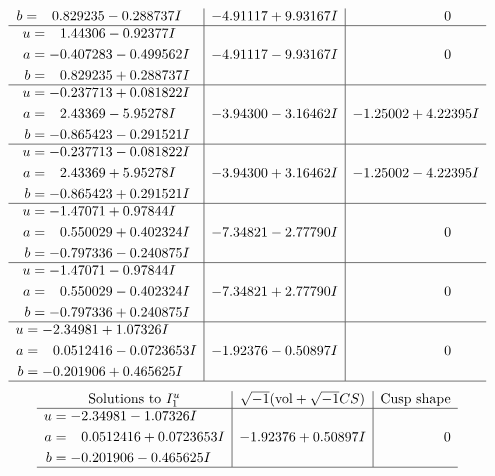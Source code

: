 \documentclass[1p]{elsarticle_modified}
\theoremstyle{definition}
\newcommand{\I}{\sqrt{-1}}
\begin{document}
$$\begin{array}{c|c|c}
\begin{aligned}
b &= \phantom{-}0.829235 - 0.288737 I\end{aligned}
 & -4.91117 + 9.93167 I & \phantom{-0.000000 } 0 \\ \hline\begin{aligned}
u &= \phantom{-}1.44306 - 0.92377 I \\
a &= -0.407283 - 0.499562 I \\
b &= \phantom{-}0.829235 + 0.288737 I\end{aligned}
 & -4.91117 - 9.93167 I & \phantom{-0.000000 } 0 \\ \hline\begin{aligned}
u &= -0.237713 + 0.081822 I \\
a &= \phantom{-}2.43369 - 5.95278 I \\
b &= -0.865423 - 0.291521 I\end{aligned}
 & -3.94300 - 3.16462 I & -1.25002 + 4.22395 I \\ \hline\begin{aligned}
u &= -0.237713 - 0.081822 I \\
a &= \phantom{-}2.43369 + 5.95278 I \\
b &= -0.865423 + 0.291521 I\end{aligned}
 & -3.94300 + 3.16462 I & -1.25002 - 4.22395 I \\ \hline\begin{aligned}
u &= -1.47071 + 0.97844 I \\
a &= \phantom{-}0.550029 + 0.402324 I \\
b &= -0.797336 - 0.240875 I\end{aligned}
 & -7.34821 - 2.77790 I & \phantom{-0.000000 } 0 \\ \hline\begin{aligned}
u &= -1.47071 - 0.97844 I \\
a &= \phantom{-}0.550029 - 0.402324 I \\
b &= -0.797336 + 0.240875 I\end{aligned}
 & -7.34821 + 2.77790 I & \phantom{-0.000000 } 0 \\ \hline\begin{aligned}
u &= -2.34981 + 1.07326 I \\
a &= \phantom{-}0.0512416 - 0.0723653 I \\
b &= -0.201906 + 0.465625 I\end{aligned}
 & -1.92376 - 0.50897 I & \phantom{-0.000000 } 0\\
 \hline 
 \end{array}$$\newpage$$\begin{array}{c|c|c}  
\text{Solutions to }I^u_{1}& \I (\text{vol} + \sqrt{-1}CS) & \text{Cusp shape}\\
 \hline 
\begin{aligned}
u &= -2.34981 - 1.07326 I \\
a &= \phantom{-}0.0512416 + 0.0723653 I \\
b &= -0.201906 - 0.465625 I\end{aligned}
 & -1.92376 + 0.50897 I & \phantom{-0.000000 } 0\\
 \hline 
 \end{array}$$\newpage\newpage\renewcommand{\arraystretch}{1}
\end{document}
